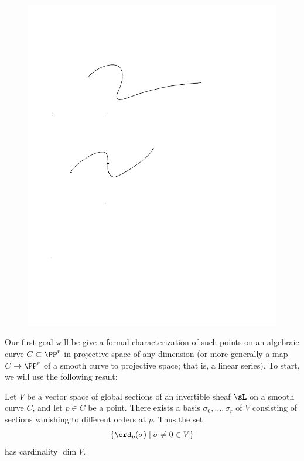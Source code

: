 \begin{center}
\begin{figure}\label{flex}
\centerline{ \includegraphics[scale=1]{"pic12.1.pdf"}}
\end{figure}
 \end{center}


Our first goal will be give a formal characterization of such points on an algebraic curve $C \subset \PP^r$ in projective space of any dimension (or more generally a map $C \to \PP^r$ of a  smooth curve to projective space; that is, a linear series). To start, we will use the following result:

\begin{proposition}\label{vanishing sequence} Let $V$ be a vector space of global sections of an invertible sheaf $\sL$ on a smooth curve $C$, and let $p \in C$ be a point. There exists a basis $\sigma_0, \dots, \sigma_r$ of $V$ consisting of sections vanishing to different orders at $p$. Thus the set
$$
\{ \ord_p(\sigma) \mid \sigma \neq 0 \in V \}
$$
 has cardinality $\dim V$.
\end{proposition}

